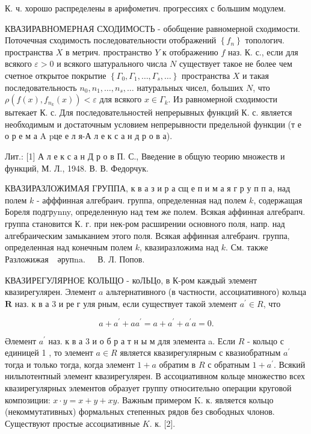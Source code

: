\documentclass[10pt]{article}
\begin{document}
К. ч. хорошо распределены в арифометич. прогрессиях с большим модулем.



КВАЗИРАВНОМЕРНАЯ СХОДИМОСТЬ - обобщение равномерной сходимости. Поточечная сходимость последовательности отображений $\left\{f_{n}\right\}$ топологич. пространства $X$ в метрич. пространство $Y$ к отображению $f$ наз. К. с., если для всякого $\varepsilon>0$ и всякого шатурального числа $N$ существует такое не более чем счетное открытое покрытие $\left\{\Gamma_{0}, \Gamma_{1}, \ldots, \Gamma_{s}, \ldots\right\}$ пространства $X$ и такая последовательность $n_{0}, n_{1}, \ldots, n_{s}, \ldots$ натуральных чисел, больших $N$, что $\rho\left(f(x), f_{n_{k}}(x)\right)<\varepsilon$ для всякого $x \in \Gamma_{k}$. Из равномерной сходимости вытекает К. с. Для последовательностей непрерывных функций К. с. является необходимым и достаточным условием непрерывности предельной функции (т е о р е м а A pце е л я-А л е к с а н д р о в а).



Лит.: [1] А л е к с а н Д р о в П. С., Введение в общую теорию множеств и функций, М. Л., 1948. В. В. Федорчук.



КВАЗИРАЗЛОЖИМАЯ ГРУППА, к в а з и р а сщ е п и м а я г р у п п а, над полем $k$ - афффинная алгебраич. группа, определенная над полем $k$, содержащая Бореля подгрynny, определенную над тем же полем. Всякая аффинная алгебрапч. группа становится К. г. при нек-ром расширении основного поля, напр. над алгебраическим замыканием этого поля. Всякая аффинная алгебраич. группа, определенная над конечным полем $k$, квазиразложима над $k$. См. также Разложижая $\begin{array}{ll}\text { әрупna. } & \text { В. Л. Попов. }\end{array}$



КВАЗИРЕГУЛЯРНОЕ КОЛЬЩО - коЛЬЦо, в К-ром каждый элемент квазирегулярен. Элемент $a$ альтернативного (в частности, ассоциативного) кольца $\boldsymbol{R}$ наз. к в а 3 и ре г уля рным, если существует такой элемент $a^{\prime} \in R$, что



\[

a+a^{\prime}+a a^{\prime}=a+a^{\prime}+a^{\prime} a=0 .

\]



Әлемент $a^{\prime}$ наз. к в а 3 и о б р а т н ы м для элемента a. Если $R$ - кольцо с единицей 1 , то элемент $a \in R$ является квазирегулярным с квазиобратным $a^{\prime}$ тогда и только тогда, когда элемент $1+a$ обратим в $R$ с обратным $1+a^{\prime}$. Всякий нильпотентный элемент квазирегулярен. В ассоциативном кольце множество всех квазирегулярных элементов образует группу относительно операции круговой композиции: $x \cdot y=x+y+x y$. Важным примером $\mathrm{K}$. к. является кольцо (некоммутативных) формальных степенных рядов без свободных члонов. Существуют простые ассоциативные $K$. к. [2].
\end{document}
